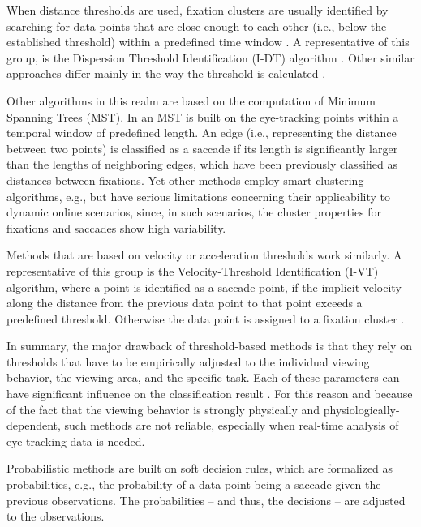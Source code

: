 \documentclass[preprint,12pt]{elsarticle}
\begin{document}
When distance thresholds are used, fixation clusters are usually identified by searching for data points that are close enough to each other (i.e., below the established threshold) within a predefined time window \cite{holmqvist-eye-tracking-a-comprehensive-guide-to-methods-and-measures}.
A representative of this group, is the Dispersion Threshold Identification (I-DT) algorithm \cite{Salvucci:2000:IFS:355017.355028}.
Other similar approaches differ mainly in the way the threshold is calculated \cite{Blignaut2009, Shic:2008:IFM:1344471.1344500}.

Other algorithms in this realm are based on the computation of Minimum Spanning Trees (MST).
In \cite{Salvucci:2000:IFS:355017.355028} an MST is built on the eye-tracking points within a temporal window of predefined length.
An edge (i.e., representing the distance between two points) is classified as a saccade if its length is significantly larger than the lengths of neighboring edges,
which have been previously classified as distances between fixations.
Yet other methods employ smart clustering algorithms, e.g., \cite{Santella:2004:RCE:968363.968368, Urruty:2007:DEF:1314303.1314308}
but have serious limitations concerning their applicability to dynamic online scenarios,
since, in such scenarios, the cluster properties for fixations and saccades show high variability.

Methods that are based on velocity or acceleration thresholds work similarly.
A representative of this group is the Velocity-Threshold Identification (I-VT) algorithm,
where a point is identified as a saccade point,
if the implicit velocity along the distance from the previous data point to that point exceeds a predefined threshold.
Otherwise the data point is assigned to a fixation cluster \cite{Salvucci:2000:IFS:355017.355028}.

In summary, the major drawback of threshold-based methods is that they rely on thresholds that have to be empirically adjusted to the individual viewing behavior,
the viewing area, and the specific task.
Each of these parameters can have significant influence on the classification result \cite{Komogortsev2013, Salvucci:2000:IFS:355017.355028}.
For this reason and because of the fact that the viewing behavior is strongly physically and physiologically-dependent, such methods are not reliable, especially when real-time analysis of eye-tracking data is needed.

Probabilistic methods are built on soft decision rules, which are formalized as probabilities, e.g.,  the probability of a data point being a saccade given the previous observations. The probabilities – and thus, the decisions – are adjusted to the observations.
\end{document}
